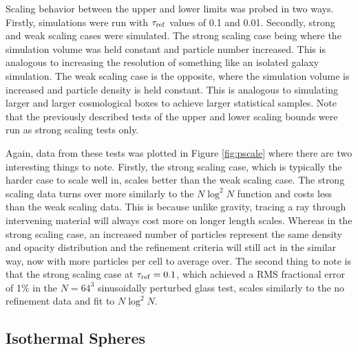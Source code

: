\documentclass[fleq,usenatbib]{mnras}
\newcommand{\tr}{\tau_{\rm ref}}
\begin{document}
Scaling behavior between the upper and lower limits was probed in two ways. 
Firstly, simulations were run with $\tr$ values of 0.1 and 0.01. Secondly, 
strong and weak scaling cases were simulated. The strong scaling case being 
where the simulation volume was held constant and particle number increased. 
This is analogous to increasing the resolution of something like an isolated 
galaxy simulation. The weak scaling case is the opposite, where the simulation 
volume is increased and particle density is held constant. This is analogous 
to simulating larger and larger cosmological boxes to achieve larger 
statistical samples. Note that the previously described tests of the upper and 
lower scaling bounds were run as strong scaling tests only.

Again, data from these tests was plotted in Figure \ref{fig:pscale} where 
there are two interesting things to note. Firstly, the strong scaling case, 
which is typically the harder case to scale well in, scales better than the 
weak scaling case. The strong scaling data turns over more similarly to the
$N\log^2{N}$ function and costs less than the weak scaling data. This is 
because unlike gravity, tracing a ray through intervening material will always 
cost more on longer length scales. Whereas in the strong scaling case, an 
increased number of particles represent the same density and opacity 
distribution and the refinement criteria will still act in the similar way, 
now with more particles per cell to average over. The second thing to note is 
that the strong scaling case at $\tr=0.1$, which achieved a RMS fractional 
error of 1\% in the $N=64^3$ sinusoidally perturbed glass test, scales 
similarly to the no refinement data and fit to $N\log^2{N}$. 

\subsection{Isothermal Spheres}
\end{document}
